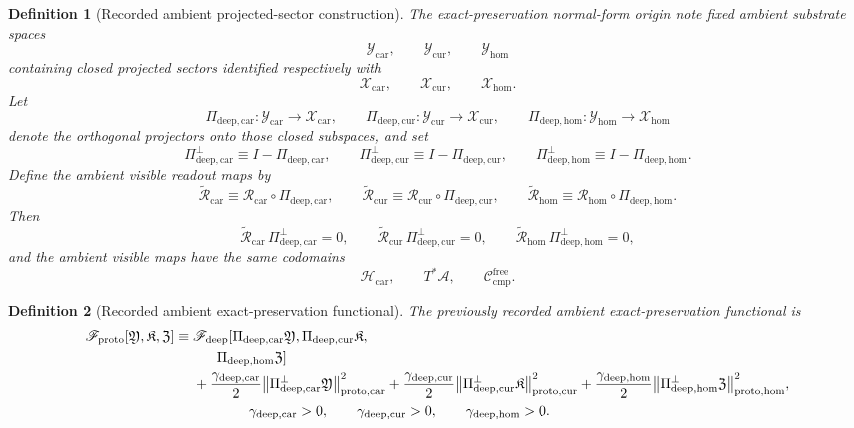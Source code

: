 \documentclass[11pt]{article}
\newcommand{\Sub}{\mathcal A}
\newcommand{\CompFree}{\mathscr C_{\mathrm{cmp}}^{\mathrm{free}}}
\newcommand{\DeepFunctional}{\mathscr F_{\mathrm{deep}}}
\newcommand{\ProtoFunctional}{\mathscr F_{\mathrm{proto}}}
\newcommand{\CarrierClass}{\mathscr H_{\mathrm{car}}}
\newcommand{\DeepTensorClass}{\mathscr X_{\mathrm{car}}}
\newcommand{\DeepRelabelClass}{\mathscr X_{\mathrm{cur}}}
\newcommand{\DeepFreeClass}{\mathscr X_{\mathrm{hom}}}
\newcommand{\CarRead}{\mathcal R_{\mathrm{car}}}
\newcommand{\CurRead}{\mathcal R_{\mathrm{cur}}}
\newcommand{\HomRead}{\mathcal R_{\mathrm{hom}}}
\newcommand{\ProtoTensorClass}{\mathscr Y_{\mathrm{car}}}
\newcommand{\ProtoRelabelClass}{\mathscr Y_{\mathrm{cur}}}
\newcommand{\ProtoFreeClass}{\mathscr Y_{\mathrm{hom}}}
\newcommand{\ProtoTensor}{\mathfrak Y}
\newcommand{\ProtoRelabel}{\mathfrak K}
\newcommand{\ProtoFree}{\mathfrak Z}
\newcommand{\ProtoCarProj}{\Pi_{\mathrm{deep,car}}}
\newcommand{\ProtoCurProj}{\Pi_{\mathrm{deep,cur}}}
\newcommand{\ProtoHomProj}{\Pi_{\mathrm{deep,hom}}}
\newcommand{\ProtoCarPerp}{\Pi_{\mathrm{deep,car}}^{\perp}}
\newcommand{\ProtoCurPerp}{\Pi_{\mathrm{deep,cur}}^{\perp}}
\newcommand{\ProtoHomPerp}{\Pi_{\mathrm{deep,hom}}^{\perp}}
\newcommand{\ProtoCarRead}{\widetilde{\mathcal R}_{\mathrm{car}}}
\newcommand{\ProtoCurRead}{\widetilde{\mathcal R}_{\mathrm{cur}}}
\newcommand{\ProtoHomRead}{\widetilde{\mathcal R}_{\mathrm{hom}}}
\newcommand{\ProtoCarGap}{\gamma_{\mathrm{deep,car}}}
\newcommand{\ProtoCurGap}{\gamma_{\mathrm{deep,cur}}}
\newcommand{\ProtoHomGap}{\gamma_{\mathrm{deep,hom}}}
\newtheorem{definition}{Definition}
\begin{document}
\begin{definition}[Recorded ambient projected-sector construction]
\label{def:proto}
The exact-preservation normal-form origin note fixed ambient substrate spaces
\[
\ProtoTensorClass,\qquad
\ProtoRelabelClass,\qquad
\ProtoFreeClass
\]
containing closed projected sectors identified respectively with
\[
\DeepTensorClass,\qquad
\DeepRelabelClass,\qquad
\DeepFreeClass.
\]
Let
\begin{equation}
\ProtoCarProj:\ProtoTensorClass\to\DeepTensorClass,
\qquad
\ProtoCurProj:\ProtoRelabelClass\to\DeepRelabelClass,
\qquad
\ProtoHomProj:\ProtoFreeClass\to\DeepFreeClass
\label{eq:proto_proj}
\end{equation}
denote the orthogonal projectors onto those closed subspaces, and set
\begin{equation}
\ProtoCarPerp\equiv I-\ProtoCarProj,
\qquad
\ProtoCurPerp\equiv I-\ProtoCurProj,
\qquad
\ProtoHomPerp\equiv I-\ProtoHomProj.
\label{eq:proto_perp}
\end{equation}
Define the ambient visible readout maps by
\begin{equation}
\ProtoCarRead\equiv \CarRead\circ\ProtoCarProj,
\qquad
\ProtoCurRead\equiv \CurRead\circ\ProtoCurProj,
\qquad
\ProtoHomRead\equiv \HomRead\circ\ProtoHomProj.
\label{eq:proto_maps}
\end{equation}
Then
\begin{equation}
\ProtoCarRead\,\ProtoCarPerp=0,
\qquad
\ProtoCurRead\,\ProtoCurPerp=0,
\qquad
\ProtoHomRead\,\ProtoHomPerp=0,
\label{eq:proto_kill}
\end{equation}
and the ambient visible maps have the same codomains
\[
\CarrierClass,\qquad
T^*\Sub,\qquad
\CompFree.
\]
\end{definition}

\begin{definition}[Recorded ambient exact-preservation functional]
\label{def:Fproto}
The previously recorded ambient exact-preservation functional is
\begin{equation}
\begin{aligned}
\ProtoFunctional[\ProtoTensor,\ProtoRelabel,\ProtoFree]
\equiv\;
&\DeepFunctional[
\ProtoCarProj\ProtoTensor,\ProtoCurProj\ProtoRelabel,
\\
&\hspace{1.7em}\ProtoHomProj\ProtoFree]
\\
&+\frac{\ProtoCarGap}{2}\norm{\ProtoCarPerp\ProtoTensor}_{\mathrm{proto,car}}^2
+\frac{\ProtoCurGap}{2}\norm{\ProtoCurPerp\ProtoRelabel}_{\mathrm{proto,cur}}^2
+\frac{\ProtoHomGap}{2}\norm{\ProtoHomPerp\ProtoFree}_{\mathrm{proto,hom}}^2,
\\
&\qquad\qquad
\ProtoCarGap>0,\qquad
\ProtoCurGap>0,\qquad
\ProtoHomGap>0.
\end{aligned}
\label{eq:Fproto}
\end{equation}
\end{definition}
\end{document}
